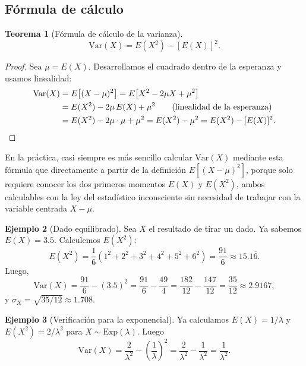 \documentclass[11pt,a4paper]{article}
\theoremstyle{plain}
\newtheorem{teorema}{Teorema}[section]
\theoremstyle{definition}
\newtheorem{ejemplo}[teorema]{Ejemplo}
\theoremstyle{remark}
\begin{document}
\subsection{Fórmula de cálculo}

\begin{teorema}[Fórmula de cálculo de la varianza]
\[
\text{Var}(X) = E(X^2) - [E(X)]^2.
\]
\end{teorema}

\begin{proof}
Sea $\mu=E(X)$. Desarrollamos el cuadrado dentro de la esperanza y usamos linealidad:
\begin{align*}
\text{Var}(X) &= E\big[(X-\mu)^2\big] = E\big[X^2 - 2\mu X + \mu^2\big] \\
&= E(X^2) - 2\mu\,E(X) + \mu^2 \qquad\text{(linealidad de la esperanza)} \\
&= E(X^2) - 2\mu\cdot\mu + \mu^2 = E(X^2) - \mu^2 = E(X^2) - [E(X)]^2. \qedhere
\end{align*}
\end{proof}

En la práctica, casi siempre es más sencillo calcular $\text{Var}(X)$ mediante esta fórmula que directamente a partir de la definición $E[(X-\mu)^2]$, porque solo requiere conocer los dos primeros momentos $E(X)$ y $E(X^2)$, ambos calculables con la ley del estadístico inconsciente sin necesidad de trabajar con la variable centrada $X-\mu$.

\begin{ejemplo}[Dado equilibrado]
Sea $X$ el resultado de tirar un dado. Ya sabemos $E(X)=3.5$. Calculemos $E(X^2)$:
\[
E(X^2) = \frac16(1^2+2^2+3^2+4^2+5^2+6^2) = \frac{91}{6} \approx 15.1\overline{6}.
\]
Luego,
\[
\text{Var}(X) = \frac{91}{6} - (3.5)^2 = \frac{91}{6} - \frac{49}{4} = \frac{182}{12}-\frac{147}{12} = \frac{35}{12} \approx 2.9167,
\]
y $\sigma_X = \sqrt{35/12}\approx 1.708$.
\end{ejemplo}

\begin{ejemplo}[Verificación para la exponencial]
Ya calculamos $E(X)=1/\lambda$ y $E(X^2)=2/\lambda^2$ para $X\sim\text{Exp}(\lambda)$. Luego
\[
\text{Var}(X) = \frac{2}{\lambda^2} - \left(\frac1\lambda\right)^2 = \frac{2}{\lambda^2}-\frac{1}{\lambda^2} = \frac{1}{\lambda^2}.
\]
\end{ejemplo}
\end{document}
